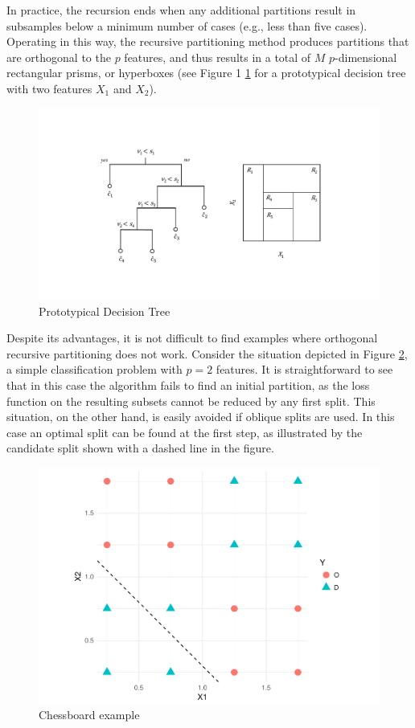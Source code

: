 \documentclass[]{elsarticle} %
\makeatletter
\def\maxwidth{\ifdim\Gin@nat@width>\linewidth\linewidth
\else\Gin@nat@width\fi}
\let\Oldincludegraphics\includegraphics
\renewcommand{\includegraphics}[1]{\Oldincludegraphics[width=\maxwidth]{#1}}
\makeatother
\begin{document}
In practice, the recursion ends when any additional partitions result in
subsamples below a minimum number of cases (e.g., less than five cases).
Operating in this way, the recursive partitioning method produces
partitions that are orthogonal to the \(p\) features, and thus results
in a total of \(M\) \(p\)-dimensional rectangular prisms, or hyperboxes
(see Figure 1 \ref{fig:fig1-example} for a prototypical decision tree
with two features \(X_1\) and \(X_2\)).

\begin{figure}[htbp]
\centering
\includegraphics{fig1-example.pdf}
\caption{\label{fig:fig1-example}Prototypical Decision Tree}
\end{figure}

Despite its advantages, it is not difficult to find examples where
orthogonal recursive partitioning does not work. Consider the situation
depicted in Figure \ref{fig:fig2-chessboard}, a simple classification
problem with \(p=2\) features. It is straightforward to see that in this
case the algorithm fails to find an initial partition, as the loss
function on the resulting subsets cannot be reduced by any first split.
This situation, on the other hand, is easily avoided if oblique splits
are used. In this case an optimal split can be found at the first step,
as illustrated by the candidate split shown with a dashed line in the
figure.

\begin{figure}[htbp]
\centering
\includegraphics{Trees_with_Base_Functions_files/figure-latex/chessboard-1.pdf}
\caption{\label{fig:fig2-chessboard}Chessboard example}
\end{figure}
\end{document}
